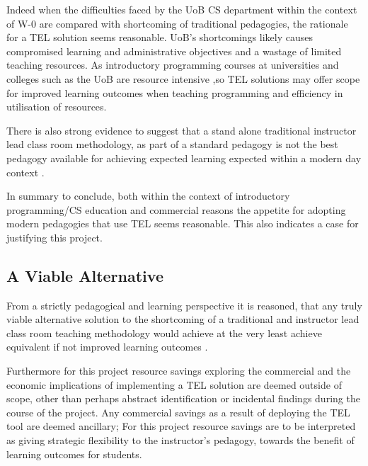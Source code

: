 Indeed when the difficulties faced by the UoB CS department within the context of W-0 are compared with shortcoming of traditional pedagogies, the rationale for a TEL solution seems reasonable. UoB's shortcomings likely causes compromised learning and administrative objectives and a wastage of limited teaching resources. As introductory programming courses at universities and colleges such as the UoB are resource intensive \cite{Chigona2008},so TEL solutions may offer scope for improved learning outcomes when teaching programming \cite{Ibanez2014,Bittencourt2015,Serrano-Laguna2015} and efficiency in utilisation of resources.



There is also strong evidence to suggest that a stand alone traditional instructor lead class room methodology, as part of a standard pedagogy is not the best pedagogy available for achieving expected learning expected within a modern day context \cite{Means2009,RickReis,Burge2011,Gordon2014,Chigona2008,Team2008}. 

In summary to conclude, both within the context of introductory programming/CS education and commercial reasons the appetite for adopting modern pedagogies that use TEL seems reasonable. This also indicates a case for justifying this project.


\label{sec:sec01}
\subsection{A Viable Alternative}
\label{subsec:subsec01}

From a strictly pedagogical and learning perspective it is reasoned, that any truly viable alternative solution to the shortcoming of a traditional and instructor lead class room teaching methodology would achieve at the very least achieve equivalent if not improved learning outcomes \cite{RickReis,Means2009}. 

Furthermore for this project resource savings exploring the commercial and the economic implications of implementing a TEL solution are deemed outside of scope, other than perhaps abstract identification or incidental findings during the course of the project. Any commercial savings as a result of deploying the TEL tool are  deemed ancillary; For this project resource savings are to be interpreted as giving strategic flexibility to the instructor's pedagogy, towards the benefit of learning outcomes for students.



\label{sec:sec01}
